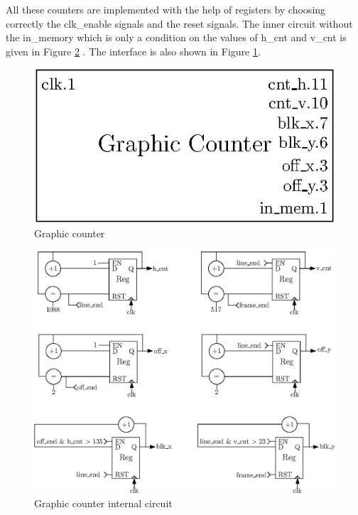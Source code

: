 All these counters are implemented with the help of registers by choosing correctly the clk\_enable 
signals and the reset signals. The inner circuit without the in\_memory which is only a condition 
on the values of h\_cnt and v\_cnt is given in Figure \ref{fig:gpu/gc_in}
. The interface is also shown in Figure \ref{fig:gpu/gc}.

\begin{figure}[H]
    \centering
    \includegraphics[scale=0.8]{Chapter4-GPU_CLKU/res/gc}
    \caption{Graphic counter}
    \label{fig:gpu/gc}
\end{figure}

\begin{figure}[H]
    \centering
    \includegraphics[width=\linewidth]{Chapter4-GPU_CLKU/res/gc_in}
    \caption{Graphic counter internal circuit}
    \label{fig:gpu/gc_in}
\end{figure}

